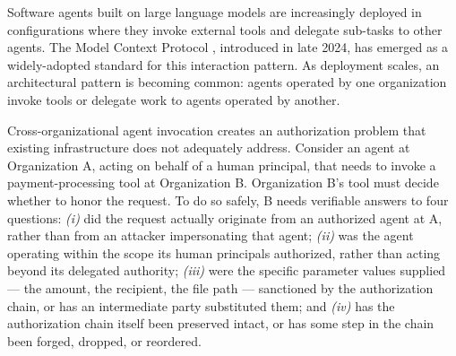 \documentclass[11pt,a4paper]{article}
\begin{document}
Software agents built on large language models are increasingly deployed in
configurations where they invoke external tools and delegate sub-tasks to
other agents. The Model Context Protocol \citep{anthropic-mcp}, introduced in
late 2024, has emerged as a widely-adopted standard for this interaction
pattern. As deployment scales, an architectural pattern is becoming
common: agents operated by one organization invoke tools or delegate
work to agents operated by another.

Cross-organizational agent invocation creates an authorization problem that
existing infrastructure does not adequately address. Consider an agent at
Organization A, acting on behalf of a human principal, that needs to invoke
a payment-processing tool at Organization B. Organization B's tool must
decide whether to honor the request. To do so safely, B needs verifiable
answers to four questions: \emph{(i)} did the request actually originate
from an authorized agent at A, rather than from an attacker impersonating
that agent; \emph{(ii)} was the agent operating within the scope its
human principals authorized, rather than acting beyond its delegated
authority; \emph{(iii)} were the specific parameter values supplied --- the
amount, the recipient, the file path --- sanctioned by the authorization
chain, or has an intermediate party substituted them; and \emph{(iv)} has
the authorization chain itself been preserved intact, or has some step in
the chain been forged, dropped, or reordered.
\end{document}
